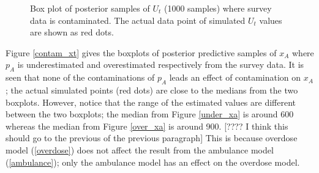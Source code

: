 \documentclass[12pt]{article}
\begin{document}
{\begin{figure}[htb]
	\centering
	\caption[Initial result: boxplot of posterior samples of $U_t$]{Box plot of posterior samples of $U_t$ (1000 samples) where survey data is contaminated.  The actual data point of simulated $U_t$ values are shown as red dots.}
	\label{contam_ut}
\end{figure}

Figure \ref{contam_xt}  gives the boxplots of posterior predictive samples of $x_A$ where $p_A$ is underestimated and overestimated respectively from the survey data. It is seen that none of the contaminations of $p_A$ leads an effect of contamination on $x_A$; the actual simulated points (red dots) are close to the medians from the two boxplots. However, notice that the range of the estimated values are different between the two boxplots; the median from Figure \ref{under_xa} is around 600 whereas the median from Figure \ref{over_xa} is around 900. [???? I think this should go to the previous of the previous paragraph] This is because overdose model (\ref{overdose}) does not affect the result from the ambulance model (\ref{ambulance}); only the ambulance model has an effect on the overdose model.

}
\end{document}
